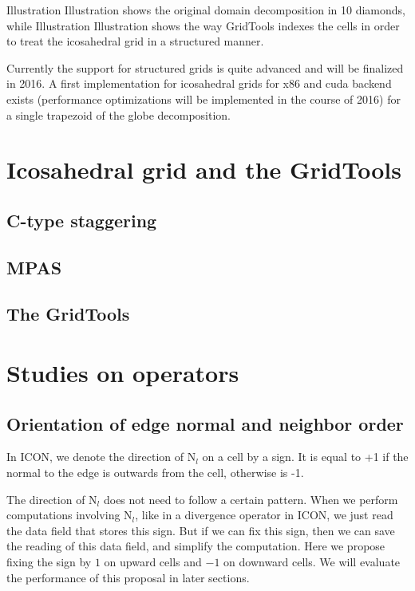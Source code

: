 \documentclass[12pt]{article}
\begin{document}
Illustration  Illustration shows the original domain decomposition in 10 diamonds, while Illustration  Illustration shows the way GridTools indexes the cells in order to treat the icosahedral grid in a structured manner.

Currently the support for structured grids is quite advanced and will be finalized in 2016.
A first implementation for icosahedral grids for x86 and cuda backend exists (performance optimizations will be implemented in the course of 2016) for a single trapezoid of the globe decomposition.

\section{Icosahedral grid and the GridTools}
\subsection{C-type staggering}
\subsection{MPAS}
\subsection{The GridTools}

\section{Studies on operators}

\subsection{Orientation of edge normal and neighbor order}
In ICON, we denote the direction of $\bm{\mathrm{N}}_l$ on a cell by a sign. It is equal to +1 if the normal to the edge is outwards from the cell, otherwise is -1.

The direction of $\bm{\mathrm{N}}_l$ does not need to follow a certain pattern. When we perform computations involving $\bm{\mathrm{N}}_l$, like in a divergence operator in ICON, we just read the data field that stores this sign. But if we can fix this sign, then we can save the reading of this data field, and simplify the computation.
Here we propose fixing the sign by $1$ on upward cells and $-1$ on downward cells. We will evaluate the performance of this proposal in later sections.
\end{document}
